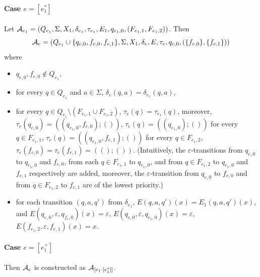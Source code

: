 \paragraph{Case $e = [e_1^{\ast}]$} 
Let $\mathcal{A}_{e_1} = (Q_{e_1}, \Sigma, X_1, \delta_{e_1}, \tau_{e_1}, E_1, q_{e_1,0}, (F_{e_1,1}, F_{e_1,2}))$. Then
\[ \mathcal{A}_e = (Q_{e_1} \cup \{q_{e,0}, f_{e,0}, f_{e,1}\}, \Sigma, X_1, \delta_e, E, \tau_e, q_{e,0}, (\{f_{e,0}\}, \{f_{e,1}\}))\] where 
		\begin{itemize}
			\item $q_{e,0}, f_{e,0} \not \in Q_{e_1}$,
			
			\item for every $q \in Q_{e_1}$ and $a \in \Sigma$, $\delta_e(q, a) = \delta_{e_1}(q, a)$, 
			
			\item for every $q \in Q_{e_1} \setminus (F_{e_1,1} \cup F_{e_1,2})$,  $\tau_e(q) = \tau_{e_1}(q)$, moreover, $\tau_e(q_{e,0}) = ((q_{e_1,0},f_{e,0}); ())$,  $\tau_e(q) = ((q_{e_1,0});())$ for every $q \in F_{e_1,1}$, $\tau_e(q) = ((q_{e_1,0}, f_{e,1});())$ for every $q \in F_{e_1,2}$, $\tau_e(f_{e,0}) =\tau_e(f_{e,1}) = (();())$. (Intuitively, the $\varepsilon$-transitions from $q_{e,0}$ to $q_{e_1,0}$ and $f_{e,0}$, from each $q \in F_{e_1,1}$ to $q_{e_1,0}$, and from $q \in F_{e_1,2}$ to $q_{e_1,0}$ and $f_{e,1}$ respectively are added, moreover, the $\varepsilon$-transition from $q_{e,0}$ to $f_{e,0}$ and from $q \in F_{e_1,2}$ to $f_{e,1}$ are of the lowest priority.)
			
			\item for each transition $(q, a, q')$ from $\delta_{e_1}$, $E(q,a,q')(x) = E_1(q,a,q')(x)$, and $E(q_{e,0},\varepsilon,q_{f_e,0})(x) =\varepsilon$, $E(q_{e,0},\varepsilon,q_{e_1,0})(x) =\varepsilon$, $E(f_{e_1,2},\varepsilon,f_{e,1})(x) =x$.
		\end{itemize}

\paragraph{Case $e = [e_1^{+}]$} Then $\mathcal{A}_e$ is constructed as $\mathcal{A}_{[e_1 \cdot [e^\ast_1]]}$.
		
